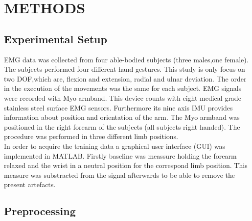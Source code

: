 \documentclass[a4paper, 10pt, conference]{ieeeconf}      %
\begin{document}
	\section{METHODS}
	
	\subsection{Experimental Setup}
EMG data was collected from four able-bodied subjects (three males,one female). The subjects performed four different hand gestures. This study is only focus on two DOF,which are, flexion and extension, radial and ulnar deviation. The order in the execution of the movements was the same for each subject.
EMG signals were recorded with Myo armband. This device counts with eight medical grade stainless steel surface EMG sensors. Furthermore its nine axis IMU provides information about position and orientation of the arm. The Myo armband was positioned in the right forearm of the subjects (all subjects right handed). The procedure was performed in three different limb positions.\\
In order to acquire the training data a graphical user interface (GUI) was implemented in MATLAB. Firstly baseline was meassure holding the forearm relaxed and the wrist in a neutral position for the correspond limb position. This measure was substracted from the signal afterwards to be able to remove the present artefacts. 

	
	
	
	\subsection{Preprocessing}
	
\end{document}
